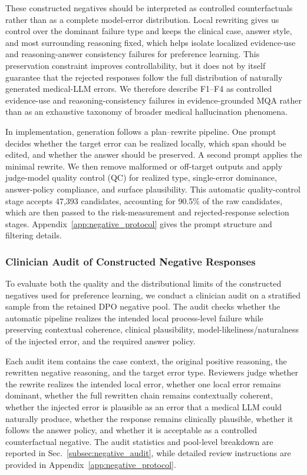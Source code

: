 \documentclass[a4paper,fleqn,doubleblind]{cas-sc}
\begin{document}
These constructed negatives should be interpreted as controlled counterfactuals rather than as a complete model-error distribution. Local rewriting gives us control over the dominant failure type and keeps the clinical case, answer style, and most surrounding reasoning fixed, which helps isolate localized evidence-use and reasoning-answer consistency failures for preference learning. This preservation constraint improves controllability, but it does not by itself guarantee that the rejected responses follow the full distribution of naturally generated medical-LLM errors. We therefore describe F1--F4 as controlled evidence-use and reasoning-consistency failures in evidence-grounded MQA rather than as an exhaustive taxonomy of broader medical hallucination phenomena.


In implementation, generation follows a plan--rewrite pipeline. One prompt decides whether the target error can be realized locally, which span should be edited, and whether the answer should be preserved. A second prompt applies the minimal rewrite. We then remove malformed or off-target outputs and apply judge-model quality control (QC) for realized type, single-error dominance, answer-policy compliance, and surface plausibility. This automatic quality-control stage accepts 47,393 candidates, accounting for 90.5\% of the raw candidates, which are then passed to the risk-measurement and rejected-response selection stages. Appendix~\ref{app:negative_protocol} gives the prompt structure and filtering details.

\subsubsection{Clinician Audit of Constructed Negative Responses}

To evaluate both the quality and the distributional limits of the constructed negatives used for preference learning, we conduct a clinician audit on a stratified sample from the retained DPO negative pool. The audit checks whether the automatic pipeline realizes the intended local process-level failure while preserving contextual coherence, clinical plausibility, model-likeliness/naturalness of the injected error, and the required answer policy.

Each audit item contains the case context, the original positive reasoning, the rewritten negative reasoning, and the target error type. Reviewers judge whether the rewrite realizes the intended local error, whether one local error remains dominant, whether the full rewritten chain remains contextually coherent, whether the injected error is plausible as an error that a medical LLM could naturally produce, whether the response remains clinically plausible, whether it follows the answer policy, and whether it is acceptable as a controlled counterfactual negative. The audit statistics and pool-level breakdown are reported in Sec.~\ref{subsec:negative_audit}, while detailed review instructions are provided in Appendix~\ref{app:negative_protocol}.
\end{document}
